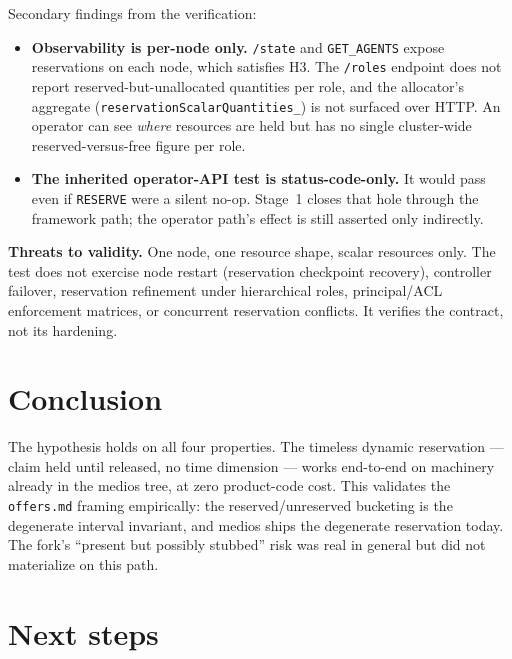 \documentclass[11pt]{article}
\newcommand{\code}[1]{\texttt{#1}}
\begin{document}
Secondary findings from the verification:

\begin{itemize}
\item \textbf{Observability is per-node only.} \code{/state} and
  \code{GET\_AGENTS} expose reservations on each node, which satisfies H3.
  The \code{/roles} endpoint does not report reserved-but-unallocated
  quantities per role, and the allocator's aggregate
  (\code{reservationScalarQuantities\_}) is not surfaced over HTTP. An
  operator can see \emph{where} resources are held but has no single
  cluster-wide reserved-versus-free figure per role.
\item \textbf{The inherited operator-API test is status-code-only.} It would
  pass even if \code{RESERVE} were a silent no-op. Stage~1 closes that hole
  through the framework path; the operator path's effect is still asserted
  only indirectly.
\end{itemize}

\textbf{Threats to validity.} One node, one resource shape, scalar resources
only. The test does not exercise node restart (reservation checkpoint
recovery), controller failover, reservation refinement under hierarchical
roles, principal/ACL enforcement matrices, or concurrent reservation
conflicts. It verifies the contract, not its hardening.

\section{Conclusion}

The hypothesis holds on all four properties. The timeless dynamic
reservation --- claim held until released, no time dimension --- works
end-to-end on machinery already in the medios tree, at zero product-code
cost. This validates the \code{offers.md} framing empirically: the
reserved/unreserved bucketing is the degenerate interval invariant, and
medios ships the degenerate reservation today. The fork's ``present but
possibly stubbed'' risk was real in general but did not materialize on this
path.

\section{Next steps}
\end{document}

